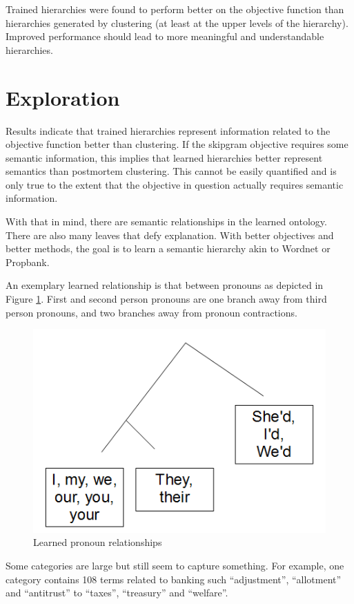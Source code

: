 \documentclass[sigconf]{acmart}
\begin{document}
Trained hierarchies were found to perform better on the objective function than hierarchies generated by clustering (at least at the upper levels of the hierarchy). Improved performance should lead to more meaningful and understandable hierarchies.

\section{Exploration}

Results indicate that trained hierarchies represent information related to the objective function better than clustering. If the skipgram objective requires some semantic information, this implies that learned hierarchies better represent semantics than postmortem clustering. This cannot be easily quantified and is only true to the extent that the objective in question actually requires semantic information.

With that in mind, there are semantic relationships in the learned ontology. There are also many leaves that defy explanation. With better objectives and better methods, the goal is to learn a semantic hierarchy akin to Wordnet or Propbank.

An exemplary learned relationship is that between pronouns as depicted in Figure \ref{f:pronouns}. First and second person pronouns are one branch away from third person pronouns, and two branches away from pronoun contractions.

\begin{figure}
\caption{Learned pronoun relationships}
\label{f:pronouns}
\includegraphics[scale=0.5]{images/pronouns.png}
\end{figure}

Some categories are large but still seem to capture something. For example, one category contains 108 terms related to banking such ``adjustment'', ``allotment'' and ``antitrust'' to ``taxes'', ``treasury'' and ``welfare''.
\end{document}
